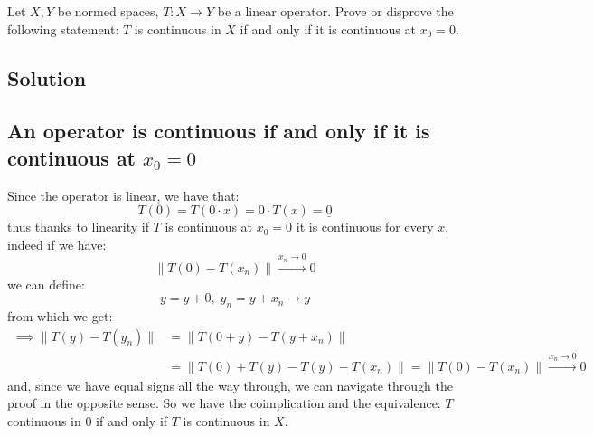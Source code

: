 
\question
Let $X, Y$ be normed spaces, $T : X \to Y$ be a linear operator. Prove or disprove the following statement: $T$ is continuous in $X$ if and only if it is continuous at $x_0 = 0$.

\subsection*{Solution}

\subsection{An operator is continuous if and only if it is continuous at \texorpdfstring{$x_0=0$}{x0=0}}
Since the operator is linear, we have that:
\[ T(0)=T(0\cdot x)=0\cdot T(x)=\underline{0} \]
thus thanks to linearity if $T$ is continuous at $x_0=0$ it is continuous for every $x$, indeed if we have:
\[ \|T(0)-T(x_n)\| \xrightarrow{x_n\to 0} 0 \]
we can define:
\[ y = y+0, \; y_n = y + x_n \to y \]
from which we get:
\begin{align*}
    \implies \|T(y)-T(y_n)\| & = \| T(0+y) - T(y+x_n) \| \\
    & = \| T(0)+T(y)-T(y)-T(x_n) \| = \| T(0)-T(x_n) \| \xrightarrow{x_n\to 0} 0
\end{align*}
and, since we have equal signs all the way through, we can navigate through the proof in the opposite sense. So we have the coimplication and the equivalence: $T$ continuous in $0$ if and only if $T$ is continuous in $X$.

